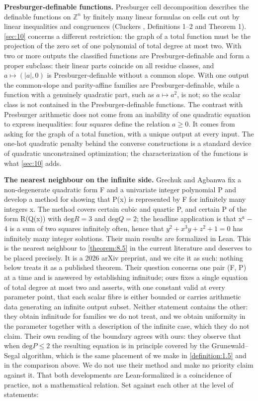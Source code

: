 \documentclass[11pt]{article}
\theoremstyle{plain}
\theoremstyle{definition}
\theoremstyle{remark}
\theoremstyle{plain}
\theoremstyle{definition}
\theoremstyle{remark}
\theoremstyle{plain}
\theoremstyle{definition}
\theoremstyle{remark}
\begin{document}
\textbf{Presburger-definable functions.} Presburger cell decomposition describes the definable functions on $ℤ^{n}$ by finitely many linear formulas on cells cut out by linear inequalities and congruences (Cluckers \cite{Clu03}, Definitions 1–2 and Theorem 1). \cref{sec:10} concerns a different restriction: the graph of a total function must be the projection of the zero set of one polynomial of total degree at most two. With two or more outputs the classified functions are Presburger-definable and form a proper subclass: their linear parts coincide on all residue classes, and $a ↦ (|a|, 0)$ is Presburger-definable without a common slope. With one output the common-slope and parity-affine families are Presburger-definable, while a function with a genuinely quadratic part, such as $a ↦ a^{2}$, is not; so the scalar class is not contained in the Presburger-definable functions. The contrast with Presburger arithmetic does not come from an inability of one quadratic equation to express inequalities: four squares define the relation $a ≥ 0$. It comes from asking for the graph of a total function, with a unique output at every input. The one-hot quadratic penalty behind the converse constructions is a standard device of quadratic unconstrained optimization; the characterization of the functions is what \cref{sec:10} adds.

\textbf{The nearest neighbour on the infinite side.} Grechuk and Agbanwa \cite{GA26} fix a non-degenerate quadratic form F and a univariate integer polynomial P and develop a method for showing that P(x) is represented by F for infinitely many integers x. The method covers certain cubic and quartic P, and certain P of the form R(Q(x)) with $\mathrm{deg} R = 3$ and $\mathrm{deg} Q = 2$; the headline application is that x⁶ − 4 is a sum of two squares infinitely often, hence that $y^{2} + x^{3}y + z^{2} + 1 = 0$ has infinitely many integer solutions. Their main results are formalized in Lean. This is the nearest neighbour to \cref{theorem:8.5} in the current literature and deserves to be placed precisely. It is a 2026 arXiv preprint, and we cite it as such: nothing below treats it as a published theorem. Their question concerns one pair (F, P) at a time and is answered by establishing infinitude; ours fixes a single equation of total degree at most two and asserts, with one constant valid at every parameter point, that each scalar fibre is either bounded or carries arithmetic data generating an infinite output subset. Neither statement contains the other: they obtain infinitude for families we do not treat, and we obtain uniformity in the parameter together with a description of the infinite case, which they do not claim. Their own reading of the boundary agrees with ours: they observe that when $\mathrm{deg} P ≤ 2$ the resulting equation is in principle covered by the Grunewald–Segal algorithm, which is the same placement of \cite{GS04} we make in \cref{definition:1.5} and in the comparison above. We do not use their method and make no priority claim against it. That both developments are Lean-formalized is a coincidence of practice, not a mathematical relation. Set against each other at the level of statements:
\end{document}
